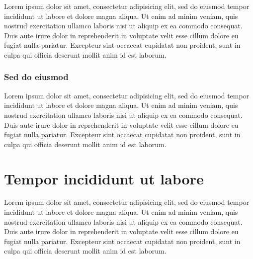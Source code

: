 \documentclass[logo=logo-eagle]{thesis_proposal}
\begin{document}
Lorem ipsum dolor sit amet, consectetur adipisicing elit, sed do
eiusmod tempor incididunt ut labore et dolore magna aliqua. Ut enim ad
minim veniam, quis nostrud exercitation ullamco laboris nisi ut
aliquip ex ea commodo consequat. Duis aute irure dolor in
reprehenderit in voluptate velit esse cillum dolore eu fugiat nulla
pariatur. Excepteur sint occaecat cupidatat non proident, sunt in
culpa qui officia deserunt mollit anim id est laborum.

\subsubsection{Sed do eiusmod}

Lorem ipsum dolor sit amet, consectetur adipisicing elit, sed do
eiusmod tempor incididunt ut labore et dolore magna aliqua. Ut enim ad
minim veniam, quis nostrud exercitation ullamco laboris nisi ut
aliquip ex ea commodo consequat. Duis aute irure dolor in
reprehenderit in voluptate velit esse cillum dolore eu fugiat nulla
pariatur. Excepteur sint occaecat cupidatat non proident, sunt in
culpa qui officia deserunt mollit anim id est laborum.



\backmatter                     %
\appendix
\section{Tempor incididunt ut labore}

Lorem ipsum dolor sit amet, consectetur adipisicing elit, sed do
eiusmod tempor incididunt ut labore et dolore magna aliqua. Ut enim ad
minim veniam, quis nostrud exercitation ullamco laboris nisi ut
aliquip ex ea commodo consequat. Duis aute irure dolor in
reprehenderit in voluptate velit esse cillum dolore eu fugiat nulla
pariatur. Excepteur sint occaecat cupidatat non proident, sunt in
culpa qui officia deserunt mollit anim id est laborum.




\end{document}
